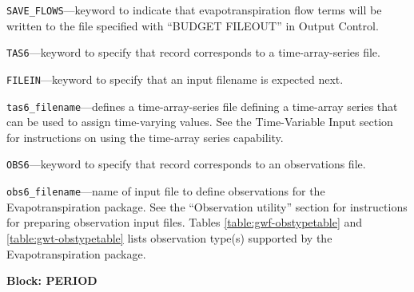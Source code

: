 \begin{description}
\item \texttt{SAVE\_FLOWS}---keyword to indicate that evapotranspiration flow terms will be written to the file specified with ``BUDGET FILEOUT'' in Output Control.

\item \texttt{TAS6}---keyword to specify that record corresponds to a time-array-series file.

\item \texttt{FILEIN}---keyword to specify that an input filename is expected next.

\item \texttt{tas6\_filename}---defines a time-array-series file defining a time-array series that can be used to assign time-varying values. See the Time-Variable Input section for instructions on using the time-array series capability.

\item \texttt{OBS6}---keyword to specify that record corresponds to an observations file.

\item \texttt{obs6\_filename}---name of input file to define observations for the Evapotranspiration package. See the ``Observation utility'' section for instructions for preparing observation input files. Tables \ref{table:gwf-obstypetable} and \ref{table:gwt-obstypetable} lists observation type(s) supported by the Evapotranspiration package.

\end{description}
\item \textbf{Block: PERIOD}

